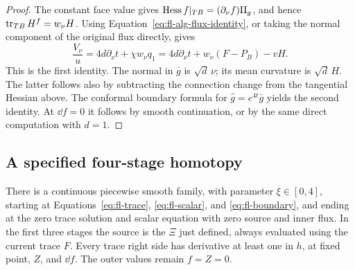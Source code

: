 \begin{proof}
The constant face value gives
\(\operatorname{Hess} f|_{TB}=(\partial_\nu f)\mathrm{II}_g\), and hence
\(\operatorname{tr}_{TB}H^f=w_\nu H\).
Using Equation~\eqref{eq:fl-alg-flux-identity}, or taking the normal
component of the original flux directly, gives
\[
 \frac{V_\nu}{u}
 =4d\partial_\nu t+\chi w_\nu q_1
 =4d\partial_\nu t+w_\nu(F-P_B)-vH.
\]
This is the first identity.  The normal in \(\bar g\) is
\(\sqrt d\,\nu\); its mean curvature is \(\sqrt d\,H\).
The latter follows also by subtracting the connection change from
the tangential Hessian above.  The conformal boundary formula for
\(\hat g=e^{4t}\bar g\) yields the second identity.
At \(\dd f=0\) it follows by smooth continuation, or by the same
direct computation with \(d=1\).
\end{proof}

\subsection{A specified four-stage homotopy}
\label{subsec:fl-homotopy}

\begin{proposition}
\label{prop:fl-homotopies}
There is a continuous piecewise smooth family, with parameter
\(\xi\in[0,4]\), starting at Equations~\eqref{eq:fl-trace},
\eqref{eq:fl-scalar}, and \eqref{eq:fl-boundary}, and ending at the
zero trace solution and scalar equation with zero source and inner
flux.  In the first three stages the source is the \(\Xi\) just
defined, always evaluated using the current trace \(F\).
Every trace right side has derivative at least one in \(h\), at fixed
point, \(Z\), and \(\dd f\).  The outer values remain \(f=Z=0\).
\end{proposition}

